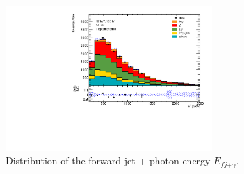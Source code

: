 \begin{figure}
    \centering
    \includegraphics[width=0.7\textwidth]{Plots/fjph_e.pdf}
    \caption{Distribution of the forward jet + photon energy $E_{fj\text{+}\gamma}$.}
    \label{fig:fjph_e}
\end{figure} 

